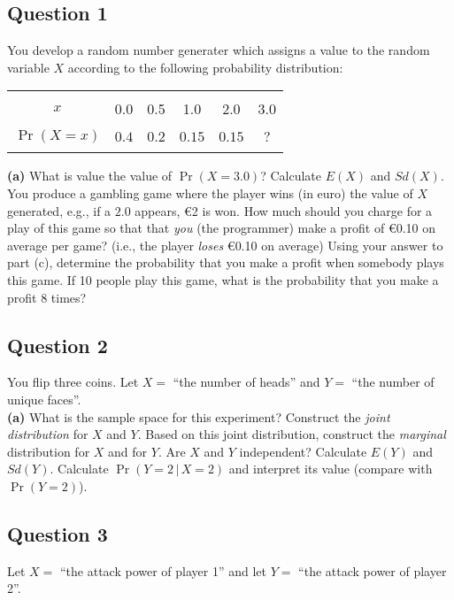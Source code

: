 \documentclass[12pt]{article}
\begin{document}
\subsection*{Question 1}
You develop a random number generater which assigns a value to the random variable $X$ according to the following probability distribution:
\begin{center}
\begin{tabular}{|c|ccccc|}
\hline
&&&&&\\[-0.4cm]
$x$ & 0.0 & 0.5 & 1.0 & 2.0 & 3.0 \\
\hline
&&&&&\\[-0.4cm]
$\Pr(X=x)$ & $0.4$ & $0.2$ & $0.15$ & $0.15$ & $?$ \\[0.1cm]
\hline
\multicolumn{6}{c}{}\\
\end{tabular}
\end{center}

{\bf(a)} What is value the value of $\Pr(X = 3.0)$?  Calculate $E(X)$ and $Sd(X)$.  You produce a gambling game where the player wins (in euro) the value of $X$ generated, e.g., if a $2.0$ appears, \euro{2} is won. How much should you charge for a play of this game so that that \emph{you} (the programmer) make a profit of \euro{0.10} on average per game? (i.e., the player \emph{loses} \euro{0.10} on average)  Using your answer to part (c), determine the probability that you make a profit when somebody plays this game.  If 10 people play this game, what is the probability that you make a profit 8 times?

\subsection*{Question 2}
You flip three coins. Let $X = $ ``the number of heads'' and $Y = $ ``the number of unique faces''.\\[-0.2cm]

{\bf(a)} What is the sample space for this experiment?  Construct the \emph{joint distribution} for $X$ and $Y$.  Based on this joint distribution, construct the \emph{marginal} distribution for $X$ and for $Y$.  Are $X$ and $Y$ independent?  Calculate $E(Y)$ and $Sd(Y)$.  Calculate $\Pr(Y=2\,|\,X=2)$ and interpret its value (compare with $\Pr(Y=2)$).


\subsection*{Question 3}
Let $X =$ ``the attack power of player 1'' and let $Y =$ ``the attack power of player 2''.\\[-0.3cm]
\end{document}

